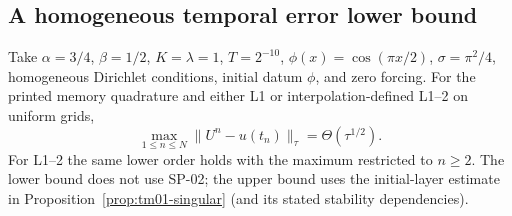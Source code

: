 \subsection{A homogeneous temporal error lower bound}
\begin{proposition}\label{prop:aud01-homogeneous}
Take $\alpha=3/4$, $\beta=1/2$, $K=\lambda=1$, $T=2^{-10}$, $\phi(x)=\cos(\pi x/2)$, $\sigma=\pi^2/4$, homogeneous Dirichlet conditions, initial datum $\phi$, and zero forcing. For the printed memory quadrature and either L1 or interpolation-defined L1--2 on uniform grids,
\[
 \max_{1\le n\le N}\|U^n-u(t_n)\|_\tau=\Theta(\tau^{1/2}).
\]
For L1--2 the same lower order holds with the maximum restricted to $n\ge2$. The lower bound does not use SP-02; the upper bound uses the initial-layer estimate in Proposition~\ref{prop:tm01-singular} (and its stated stability dependencies).
\end{proposition}
